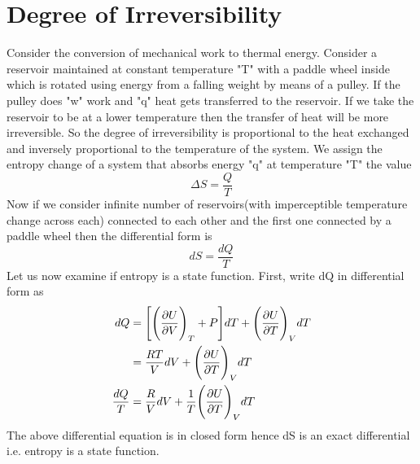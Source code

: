 \documentclass[12pt]{article}
\begin{document}
\section{Degree of Irreversibility}
Consider the conversion of mechanical work to thermal energy. Consider a reservoir maintained at constant temperature "T" with a paddle wheel inside which is rotated using energy from a falling weight by means of a pulley. If the pulley does "w" work and "q" heat gets transferred to the reservoir. If we take the reservoir to be at a lower temperature then the transfer of heat will be more irreversible. So the degree of irreversibility is proportional to the heat exchanged and inversely proportional to the temperature of the system. We assign the entropy change of a system that absorbs energy "q" at temperature "T" the value 
\begin{equation}
	\Delta S=\frac{Q}{T}
\end{equation}
Now if we consider infinite number of reservoirs(with imperceptible temperature change across each) connected to each other and the first one connected by a paddle wheel then the differential form is
$$dS=\frac{dQ}{T}$$
Let us now examine if entropy is a state function. First, write dQ in differential form as
\begin{align}
	dQ&=\Bigg[\Bigg(\pdv{U}{V}\Bigg)_T+P\Bigg]dT+\Bigg(\pdv{U}{T}\Bigg)_V dT\\
      &=\frac{RT}{V}dV+\Bigg(\pdv{U}{T}\Bigg)_V dT	\\
    \frac{dQ}{T}&=\frac{R}{V}dV+\frac{1}{T}\Bigg(\pdv{U}{T}\Bigg)_V dT\\
\end{align}
The above differential equation is in closed form hence dS is an exact differential i.e. entropy is a state function.
\end{document}
